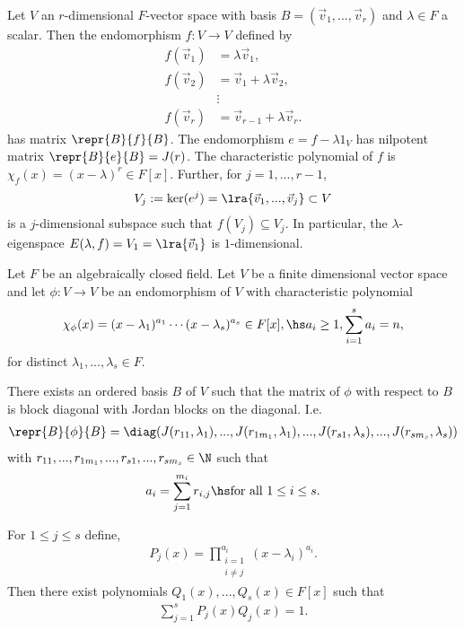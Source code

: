 \documentclass{article}
\begin{document}
\begin{lemma}
	Let $V$ an $r$-dimensional $F$-vector space with basis $B=(\vec v_1,...,\vec v_r)$ and
	$\lambda\in F$ a scalar. Then the endomorphism $f:V\to V$ defined by
	\begin{align*}
		f(\vec v_1) & =\lambda \vec v_1,              \\
		f(\vec v_2) & =\vec v_1+\lambda \vec v_2,     \\
		            & \vdots                          \\
		f(\vec v_r) & =\vec v_{r-1}+\lambda \vec v_r.
	\end{align*}
	has matrix $\repr{B}{f}{B}$. The endomorphism $e=f-\lambda 1_V$ has nilpotent matrix
	$\repr{B}{e}{B}=J(r)$. The characteristic polynomial of $f$ is $\chi_f(x)=(x-\lambda)^r\in F[x]$.
	Further, for $j=1,...,r-1$,
	\begin{align*}
		V_j := \ker(e^j)=\lra{\vec v_1,...,\vec v_j}\subset V
	\end{align*}
	is a $j$-dimensional subspace such that $f(V_j)\subseteq V_j$. In particular, the $\lambda$-eigenspace
	$E(\lambda, f)=V_1=\lra{\vec v_1}$ is $1$-dimensional.
\end{lemma}

Let $F$ be an algebraically closed field. Let $V$ be a finite dimensional vector space and let
$\phi:V\to V$ be an endomorphism of $V$ with characteristic polynomial
\begin{align*}
	\chi_\phi(x)=(x-\lambda_1)^{a_1}\cdots (x-\lambda_s)^{a_s}\in F[x], \hs a_i\geq 1,\sum_{i=1}^s a_i=n,
\end{align*}
for distinct $\lambda_1,...,\lambda_s\in F$.

\begin{theorem}
	There exists an ordered basis $B$ of $V$ such that
	the matrix of $\phi$ with respect to $B$ is block diagonal with Jordan blocks on the diagonal. I.e.
	\begin{align*}
		\repr{B}{\phi}{B}=\diag(J(r_{11},\lambda_1),...,J(r_{1m_1},\lambda_1),...,J(r_{s1},\lambda_s),...,J(r_{sm_s},\lambda_s))
	\end{align*}
	with $r_{11},...,r_{1m_1},...,r_{s1},...,r_{sm_s}\in\N$ such that
	\begin{align*}
		a_i=\sum_{j=1}^{m_i} r_{i,j} \hs\text{for all }1\leq i\leq s.
	\end{align*}
\end{theorem}

\begin{lemma}[Lemma 6.3.1]
	For $1\leq j\leq s$ define,
	\begin{align*}
		P_j(x)=\prod_{\substack{i=1 \\ i\neq j}}^{a_i}(x-\lambda_i)^{a_i}.
	\end{align*}
	Then there exist polynomials $Q_1(x),...,Q_s(x)\in F[x]$ such that
	\begin{align*}
		\sum_{j=1}^s P_j(x)Q_j(x)=1.
	\end{align*}
\end{lemma}
\end{document}

